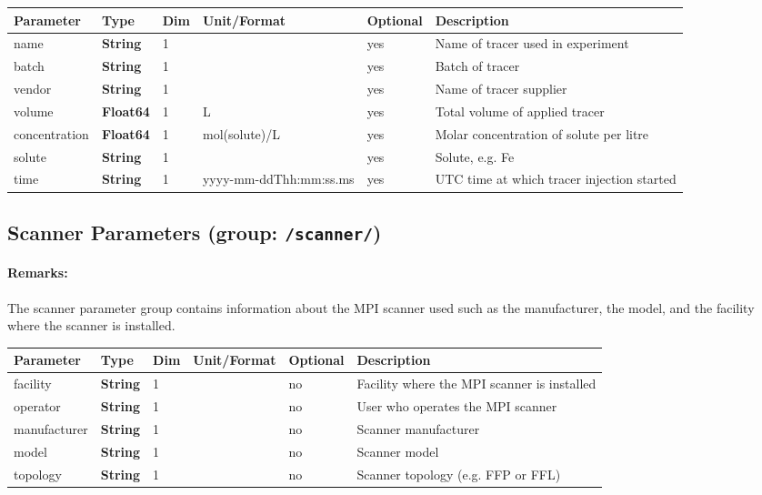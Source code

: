 \documentclass[landscape]{article} %
\newcommand{\inl}[1]{\lstinline[columns=fixed]{#1}}
\newcommand{\inltab}[1]{{\ttfamily\bfseries\color{blue}#1}}
\newcommand{\inlvar}[1]{{\ttfamily#1}}
\begin{document}
\noindent \begin{tabularx}{\columnwidth}{lllllX} 
\textbf{Parameter} & \textbf{Type} & \textbf{Dim} & \textbf{Unit/Format} & \textbf{Optional} & \textbf{Description} \\ \hline 
\inlvar{name} & \inltab{String} & 1 & & yes & Name of tracer used in experiment \\ \hline
\inlvar{batch} & \inltab{String} & 1 & & yes & Batch of tracer \\ \hline
\inlvar{vendor} & \inltab{String} & 1 & & yes & Name of tracer supplier \\ \hline
\inlvar{volume} & \inltab{Float64} & 1 & L & yes & Total volume of applied tracer \\ \hline
\inlvar{concentration} & \inltab{Float64} & 1 & mol(solute)/L & yes & Molar concentration of solute per litre \\ \hline
\inlvar{solute} & \inltab{String} & 1 & & yes & Solute, e.g. Fe \\ \hline
\inlvar{time} & \inltab{String} & 1 & yyyy-mm-ddThh:mm:ss.ms & yes & UTC time at which tracer injection started \\ \hline
\end{tabularx}

\subsection{Scanner Parameters (group: \inl{/scanner/})}

\begin{multicols}{2}

\paragraph{Remarks:} The scanner parameter group contains information about the MPI scanner used such as the manufacturer, the model, and the facility where the scanner is installed.

\end{multicols}


\noindent \begin{tabularx}{\columnwidth}{lllllX}
\noindent \textbf{Parameter} & \textbf{Type} & \textbf{Dim} & \textbf{Unit/Format} & \textbf{Optional} & \textbf{Description} \\ \hline 
\inlvar{facility} & \inltab{String} & 1 & & no & Facility where the MPI scanner is installed \\ \hline 
\inlvar{operator} & \inltab{String} & 1 & & no & User who operates the MPI scanner \\ \hline 
\inlvar{manufacturer} & \inltab{String} & 1 & & no & Scanner manufacturer \\ \hline 
\inlvar{model} & \inltab{String} & 1 & & no & Scanner model \\ \hline 
\inlvar{topology} & \inltab{String} & 1 & & no & Scanner topology (e.g. FFP or FFL)\\ \hline 
\end{tabularx}
\end{document}
